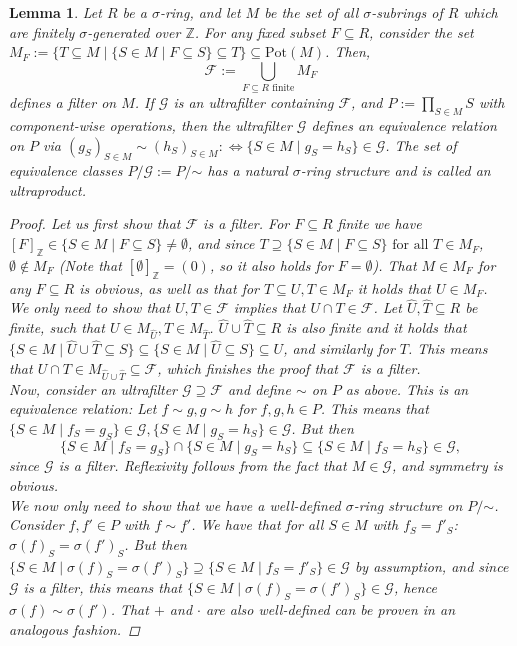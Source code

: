 \documentclass{article}
\def\Z{\mathbb{Z}}
\def\s{\sigma}
\def\fa{\text{ for all }}
\newcommand{\textsim}{\mathord{\sim}}
\theoremstyle{plain}
\newtheorem{lem}[Satz]{Lemma}
\theoremstyle{definition}
\begin{document}
\begin{lem}\label{lemmafilters}
Let $R$ be a $\s$-ring, and let $M$ be the set of all $\s$-subrings of $R$ which are finitely $\s$-generated over $\Z$. For any fixed subset $F \subseteq R$, consider the set $M_F:= \{ T \subseteq M \mid \{S \in M \mid F \subseteq S \} \subseteq T \} \subseteq \text{Pot}(M)$. 
Then, \[ \mathcal{F}:= \bigcup_{ F \subseteq R \text{ finite} } M_F \]
 defines a filter on $M$. If $\mathcal{G}$ is an ultrafilter containing $\mathcal{F}$, and $P:= \prod_{S \in M} S$ with component-wise operations,
 then the ultrafilter $\mathcal{G}$ defines an equivalence relation on $P$ via $(g_S)_{S \in M} \sim (h_S)_{S \in M} : \Leftrightarrow \{ S \in M \mid g_S = h_S \} \in \mathcal{G}$. 
The set of equivalence classes $P/\mathcal{G}:= P/\textsim$ has a natural $\s$-ring structure and is called an ultraproduct. %
\begin{proof}
Let us first show that $\mathcal{F}$ is a filter. For $F \subseteq R$ finite we have $[F]_{\Z} \in \{ S \in M \mid F \subseteq S \} \neq \emptyset$, and since $T \supseteq \{ S \in M \mid F \subseteq S \} \fa T \in M_F$, $\emptyset \notin M_F$ (Note that $[\emptyset]_\Z = (0)$, so it also holds for $F = \emptyset$).
  That $M \in M_F$ for any $F \subseteq R$ is obvious, as well as that for $T \subseteq U, T \in M_F$ it holds that $U \in M_F$. \\ 
\indent We only need to show that $U,T \in \mathcal{F}$ implies that $U \cap T \in \mathcal{F}$.
  Let $\hat U, \hat T \subseteq R$ be finite, such that $U \in M_{\hat U}, T \in M_{\hat T}$. $\hat U \cup \hat T \subseteq R$ is also finite and it holds that  $\{ S \in M \mid \hat U \cup \hat T \subseteq S \} \subseteq \{ S \in M \mid \hat U \subseteq S \} \subseteq U$,
 and similarly for $T$. This means that $U \cap T \in M_{\hat U \cup \hat T} \subseteq \mathcal{F}$, which finishes the proof that $\mathcal{F}$ is a filter. \\

 Now, consider an ultrafilter $\mathcal{G} \supseteq \mathcal{F}$ and define $\sim$ on $P$ as above. This is an equivalence relation: Let $f \sim g, g \sim h$ for $f,g,h \in P$. 
 This means that $\{ S \in M \mid f_S = g_S \} \in \mathcal{G}, \{ S \in M \mid g_S = h_S \} \in \mathcal{G}$. But then $$\{ S \in M \mid f_S = g_S \} \cap \{ S \in M \mid g_S = h_S \} \subseteq \{ S \in M \mid f_S = h_S \} \in \mathcal{G},$$
 since $\mathcal{G}$ is a filter.
 Reflexivity follows from the fact that $M \in \mathcal{G}$, and symmetry is obvious. \\
\indent  We now only need to show that we have a well-defined $\s$-ring structure on $P/\textsim$.
 Consider $f,f' \in P$ with $f \sim f'$. We have that for all $S \in M$ with $f_S = f'_S$:  $\sigma(f)_S = \sigma(f')_S$. 
 But then $\{ S \in M \mid \s(f)_S = \s(f')_S \} \supseteq \{ S \in M \mid f_S = f'_S \} \in \mathcal{G}$ by assumption, and since $\mathcal{G}$ is a filter, this means that $\{ S \in M \mid \s(f)_S = \s(f')_S \} \in \mathcal{G}$,
 hence $\s(f) \sim \s(f')$. That $+$ and $\cdot$ are also well-defined can be proven in an analogous fashion.
\end{proof}
\end{lem}
\end{document}
